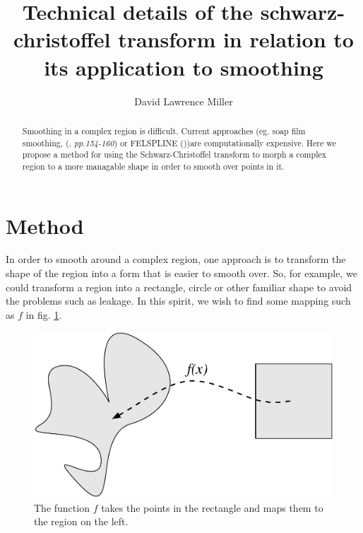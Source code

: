 \documentclass[a4paper,10pt]{amsart}
\title{Technical details of the schwarz-christoffel transform in relation to its application to smoothing}
\author{David Lawrence Miller}
\newcommand{\sch}{Schwarz-Christoffel }
\begin{document}
 
\begin{abstract}
Smoothing in a complex region is difficult. Current approaches (eg. soap film smoothing, (\cite{soap}, \emph{pp.154-160}) or FELSPLINE (\cite{ramsay}))are computationally expensive. Here we propose a method for using the \sch transform to morph a complex region to a more managable shape in order to smooth over points in it.
\end{abstract}
 
 
\newtheorem{thm}{Theorem}[section]
 
\newtheorem{defn}{Definition}[section]
 
\maketitle

\section{Method}

In order to smooth around a complex region, one approach is to transform the shape of the region into a form that is easier to smooth over. So, for example, we could transform a region into a rectangle, circle or other familiar shape to avoid the problems such as leakage. In this spirit, we wish to find some mapping such as $f$ in fig. \ref{simpledia}.

\begin{figure} [htbp]
\centering
\includegraphics[scale=0.3]{figs/simpledia.pdf}
\caption{The function $f$ takes the points in the rectangle and maps them to the region on the left.}
\label{simpledia}
\end{figure}
\end{document}

